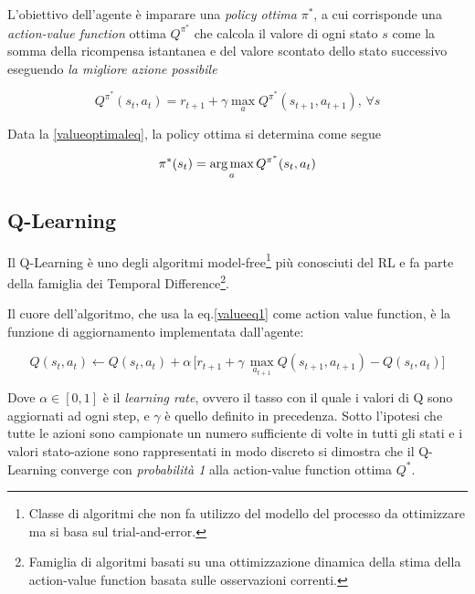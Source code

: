 L'obiettivo dell'agente è imparare una \textit{policy ottima} $\pi^*$, a cui corrisponde una \textit{action-value function} ottima $Q^{\pi^*}$ che calcola il valore di ogni stato $s$ come la somma della ricompensa istantanea e del valore scontato dello stato successivo eseguendo \textit{la migliore azione possibile}

\begin{equation}\label{valueoptimaleq}
	Q^{\pi^*}(s_t,a_t) = r_{t+1} + \gamma \max_{a} Q^{\pi^*}(s_{t+1},a_{t+1}),\, \forall s
\end{equation}

Data la \ref{valueoptimaleq}, la policy ottima si determina come segue

\begin{equation}\label{qtopi}
	\pi^*(s_t) = \operatorname*{arg\,max}_aQ^{\pi^*}(s_t,a_t)
\end{equation}

\clearpage

\subsection{Q-Learning}

Il Q-Learning\cite{qlearningPaper} è uno degli algoritmi model-free\footnote{Classe di algoritmi che non fa utilizzo del modello del processo da ottimizzare ma si basa sul trial-and-error.} più conosciuti del RL e fa parte della famiglia dei Temporal Difference\footnote{Famiglia di algoritmi basati su una ottimizzazione dinamica della stima della action-value function basata sulle osservazioni correnti.}. 

Il cuore dell'algoritmo, che usa la eq.\ref{valueeq1} come action value function, è la funzione di aggiornamento implementata dall'agente:

\begin{equation}
	Q(s_t,a_t) \xleftarrow{} Q(s_t,a_t) + 
	\alpha \,\Big[ r_{t+1} + \gamma\, \max_{a_{t+1}}Q(s_{t+1},a_{t+1}) - Q(s_t,a_t)\Big]
\end{equation}

Dove $\alpha \in [0,1]$ è il \textit{learning rate}, ovvero il tasso con il quale i valori di Q sono aggiornati ad ogni step, e $\gamma$ è quello definito in precedenza.
Sotto l'ipotesi che tutte le azioni sono campionate un numero sufficiente di volte in tutti gli stati e i valori stato-azione sono rappresentati in modo discreto si dimostra\cite{qlearningtecnicalPaper} che il Q-Learning converge con \textit{probabilità 1} alla action-value function ottima $Q^*$.

